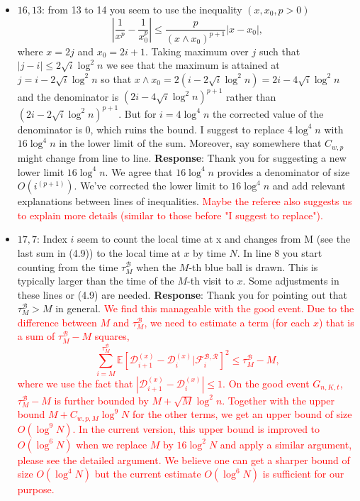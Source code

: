 \documentclass[11pt,a4paper]{article}
\numberwithin{equation}{section}
\newcommand{\abs}[1]{\left\vert #1 \right\vert}
\def\TBF#1{\textcolor{red}{#1}} %
\begin{document}
\begin{itemize}
		\item 
		$16,13$: from 13 to 14 you seem to use the inequality $(x, x_0, p > 0)$
		$$
		\abs{\frac{1}{x^p} - \frac{1}{x_0^p}} \leq \frac{p}{\left(x\wedge x_0 \right)^{p+1}} \abs{x-x_0},
		$$
		where $x = 2j$ and $x_0 = 2i + 1$. Taking maximum over $j$ such that $\abs{j-i}\leq  2\sqrt{i} \log^2 n$
		we see that the maximum is attained at $j = i- 2\sqrt{i} \log^2 n$ so that $x\wedge x_0 = 2\left( i- 2\sqrt{i} \log^2 n
		\right) = 2i - 4 \sqrt{i} \log^2 n$
		and the denominator is $(2i - 4\sqrt{i} \log^2 n)^{p+1}$ rather than $(2i-2\sqrt{i} \log^2 n)^{p+1}$. But for $i = 4 \log^4 n$ the corrected
		value of the denominator is $0$, which ruins the bound. I suggest to replace $4 \log^4 n$ with $16 \log^4 n$ in the lower limit of the sum. Moreover, say somewhere that $C_{w,p}$ might change from line to line.
		\subitem \textbf{Response}: Thank you for suggesting a new lower limit $16 \log^4 n $. We agree that $16 \log^4 n$ provides a denominator of size $O\left(i^{(p+1)}\right)$. We've corrected the lower limit to $16\log^4 n$ and add relevant explanations between lines of inequalities.  \TBF{Maybe the referee also suggests us to explain more details (similar to those before "I suggest to replace").}
		
		
		\item
		$17,7$: Index $i$ seem to count the local time at x and changes from M (see the last sum in (4.9)) to the local time at $x$ by time $N$. In line 8 you start counting from the time $\tau_M^{\mathcal{B}}$ when the $M$-th blue ball is drawn. 
		This is typically larger than the time of the $M$-th visit to $x$. Some adjustments in these lines or (4.9) are needed.
		\subitem \textbf{Response}: Thank you for pointing out that $\tau_M^{\mathcal{B}} > M $ in general. \TBF{We find this manageable with the good event. Due to the difference between $M$ and $\tau^{\mathcal{B}}_M$, we need to estimate a 
			term (for each $x$) that is a sum of $\tau^{\mathcal{B}}_M -M$ squares, 
			$$
			\sum_{i = M }^{\tau_M^\mathcal{B}} \mathbb{E}\left[\mathcal{D}^{(x)}_{i+1}-\mathcal{D}^{(x)}_{i} \vert \mathcal{F}_i^{\mathcal{B},\mathcal{R}} \right]^2 \leq \tau_M^\mathcal{B}- M,
			$$
			where we use the fact that $\abs{\mathcal{D}^{(x)}_{i+1}-\mathcal{D}^{(x)}_{i}} \leq 1$. On the good event $G_{n,K,t}$, $\tau_M^\mathcal{B}- M$ is further bounded by $M+\sqrt{M}\log^2 n$. Together with the upper bound $M+C_{w,p,M} \log^9 N$ for the other terms, we get an upper bound of size $O(\log^9 N)$. In the current version, this upper bound is improved to $O(\log^6 N)$ when we replace $M$ by $16\log^2 N$ and apply a similar argument, please see the detailed argument. We believe one can get a sharper bound of size $O(\log^4 N)$ but the current estimate $O(\log^6 N)$ is sufficient for our purpose.
		}	
		

\end{itemize}
\end{document}
